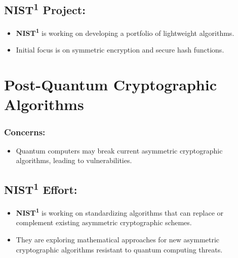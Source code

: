 \subsection{NIST\textsuperscript{1} Project:}
\begin{itemize}
    \item \textbf{NIST\textsuperscript{1}} is working on developing a portfolio of lightweight algorithms.
    \item Initial focus is on symmetric encryption and secure hash functions.
\end{itemize}

\section{Post-Quantum Cryptographic Algorithms}

\subsubsection{Concerns:}
\begin{itemize}
    \item Quantum computers may break current asymmetric cryptographic algorithms, leading to vulnerabilities.
\end{itemize}

\subsection{NIST\textsuperscript{1} Effort:}
\begin{itemize}
    \item \textbf{NIST\textsuperscript{1}} is working on standardizing algorithms that can replace or complement existing asymmetric cryptographic schemes.
    \item They are exploring mathematical approaches for new asymmetric cryptographic algorithms resistant to quantum computing threats.
\end{itemize}



